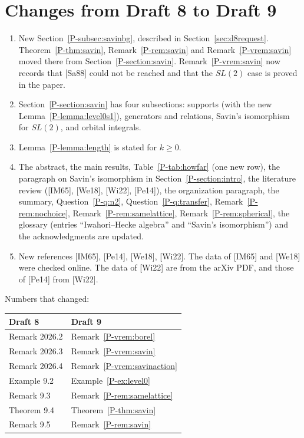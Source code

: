 \documentclass[12pt,letterpaper]{amsart}
\begin{document}
\section{Changes from Draft 8 to Draft 9}
\label{sec:d8d9}

\begin{enumerate}[leftmargin=1.5em]
\item New Section~\ref{P-subsec:savinbg}, described in
Section~\ref{sec:d8request}. Theorem~\ref{P-thm:savin},
Remark~\ref{P-rem:savin} and Remark~\ref{P-vrem:savin} moved there from
Section~\ref{P-section:savin}. Remark~\ref{P-vrem:savin} now records
that [Sa88] could not be reached and that the $SL(2)$ case is proved in
the paper.
\item Section~\ref{P-section:savin} has four subsections: supports
(with the new Lemma~\ref{P-lemma:level0s1}), generators and relations,
Savin's isomorphism for $SL(2)$, and orbital integrals.
\item Lemma~\ref{P-lemma:length} is stated for $k\geq 0$.
\item The abstract, the main results, Table~\ref{P-tab:howfar} (one new
row), the paragraph on Savin's isomorphism in
Section~\ref{P-section:intro}, the literature review ([IM65], [We18],
[Wi22], [Pe14]), the organization paragraph, the summary, Question~\ref{P-q:n2},
Question~\ref{P-q:transfer}, Remark~\ref{P-rem:nochoice},
Remark~\ref{P-rem:samelattice}, Remark~\ref{P-rem:spherical}, the
glossary (entries ``Iwahori--Hecke algebra'' and ``Savin's
isomorphism'') and the acknowledgments are updated.
\item New references [IM65], [Pe14], [We18], [Wi22]. The data of [IM65]
and [We18] were checked online. The data of [Wi22] are from the arXiv
PDF, and those of [Pe14] from [Wi22].
\end{enumerate}

\noindent
Numbers that changed:

\begin{center}
\begin{tabular}{@{}ll@{}}
\toprule
Draft 8 & Draft 9 \\
\midrule
Remark 2026.2 & Remark~\ref{P-vrem:borel} \\
Remark 2026.3 & Remark~\ref{P-vrem:savin} \\
Remark 2026.4 & Remark~\ref{P-vrem:savinaction} \\
Example 9.2 & Example~\ref{P-ex:level0} \\
Remark 9.3 & Remark~\ref{P-rem:samelattice} \\
Theorem 9.4 & Theorem~\ref{P-thm:savin} \\
Remark 9.5 & Remark~\ref{P-rem:savin} \\
\bottomrule
\end{tabular}
\end{center}
\end{document}
